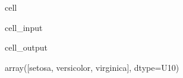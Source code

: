 \documentclass[letterpaper,10pt,english]{jupyterBook}
\begin{document}
\begin{sphinxuseclass}{cell}\begin{sphinxVerbatimInput}

\begin{sphinxuseclass}{cell_input}
\begin{sphinxVerbatim}[commandchars=\\\{\}]
\end{sphinxVerbatim}

\end{sphinxuseclass}\end{sphinxVerbatimInput}
\begin{sphinxVerbatimOutput}

\begin{sphinxuseclass}{cell_output}
\begin{sphinxVerbatim}[commandchars=\\\{\}]
array([\PYGZsq{}setosa\PYGZsq{}, \PYGZsq{}versicolor\PYGZsq{}, \PYGZsq{}virginica\PYGZsq{}], dtype=\PYGZsq{}\PYGZlt{}U10\PYGZsq{})
\end{sphinxVerbatim}

\end{sphinxuseclass}\end{sphinxVerbatimOutput}

\end{sphinxuseclass}
\end{document}
